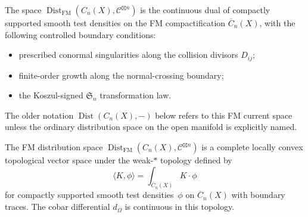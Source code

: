 \begin{definition}
The space
$\operatorname{Dist}_{\mathrm{FM}}(C_n(X),\mathcal{C}^{\boxtimes n})$
is the continuous dual of compactly supported smooth test densities on
the FM compactification $\overline{C}_n(X)$, with the following
controlled boundary conditions:
\begin{itemize}
\item prescribed conormal singularities along the collision divisors
 $D_{ij}$;
\item finite-order growth along the normal-crossing boundary;
\item the Koszul-signed $\mathfrak{S}_n$ transformation law.
\end{itemize}
The older notation $\operatorname{Dist}(C_n(X),-)$ below refers to this
FM current space unless the ordinary distribution space on the open
manifold is explicitly named.
\end{definition}

\begin{theorem}\label{thm:weak-topology}
The FM distribution space
$\operatorname{Dist}_{\mathrm{FM}}(C_n(X),\mathcal{C}^{\boxtimes n})$
is a complete locally convex topological vector space under the
weak-$*$ topology defined by
\[
\langle K,\phi\rangle
=\int_{\overline{C}_n(X)} K\cdot\phi
\]
for compactly supported smooth test densities~$\phi$ on
$\overline{C}_n(X)$ with boundary traces. The cobar differential
$d_\Omega$ is continuous in this topology.
\end{theorem}

